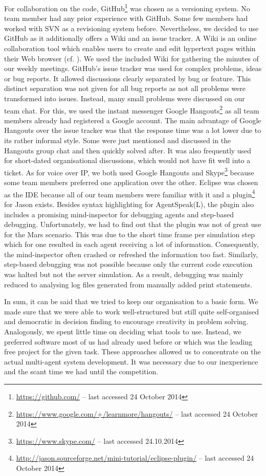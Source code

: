 For collaboration on the code, GitHub\footnote{\url{https://github.com/} -- last accessed 24 October 2014} was chosen as a versioning system.
No team member had any prior experience with GitHub.
Some few members had worked with SVN as a revisioning system before.
Nevertheless, we decided to use GitHub as it additionally offers a Wiki and an issue tracker.
A Wiki is an online collaboration tool which enables users to create and edit hypertext pages within their Web browser (cf. \cite{leuf_wiki_2001}).
We used the included Wiki for gathering the minutes of our weekly meetings.
GitHub's issue tracker was used for complex problems, ideas or bug reports.
It allowed discussions clearly separated by bug or feature.
This distinct separation was not given for all bug reports as not all problems were transformed into issues.
Instead, many small problems were discussed on our team chat.
For this, we used the instant messenger Google Hangouts\footnote{\url{https://www.google.com/+/learnmore/hangouts/} -- last accessed 24 October 2014} as all team members already had registered a Google account.
The main advantage of Google Hangouts over the issue tracker was that the response time was a lot lower due to its rather informal style.
Some were just mentioned and discussed in the Hangouts group chat and then quickly solved after.
It was also frequently used for short-dated organisational discussions, which would not have fit well into a ticket.
As for voice over IP, we both used Google Hangouts and Skype\footnote{\url{https://www.skype.com/} -- last accessed 24.10.2014} because some team members preferred one application over the other.
Eclipse was chosen as the IDE because all of our team members were familiar with it and a plugin\footnote{\url{http://jason.sourceforge.net/mini-tutorial/eclipse-plugin/} -- last accessed 24 October 2014} for Jason exists.
Besides syntax highlighting for AgentSpeak(L), the plugin also includes a promising mind-inspector for debugging agents and step-based debugging.
Unfortunately, we had to find out that the plugin was not of great use for the Mars scenario.
This was due to the short time frame per simulation step which for one resulted in each agent receiving a lot of information.
Consequently, the mind-inspector often crashed or refreshed the information too fast.
Similarly, step-based debugging was not possible because only the current code execution was halted but not the server simulation.
As a result, debugging was mainly reduced to analysing log files generated from manually added print statements.

In sum, it can be said that we tried to keep our organisation to a basic form.
We made sure that we were able to work well-structured but still quite self-organised and democratic in decision finding to encourage creativity in problem solving.
Analogously, we spent little time on deciding what tools to use.
Instead, we preferred software most of us had already used before or which was the leading free project for the given task.
These approaches allowed us to concentrate on the actual multi-agent system development.
It was necessary due to our inexperience and the scant time we had until the competition.


